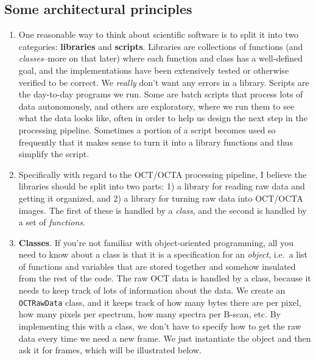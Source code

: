\documentclass[11pt]{article}
\begin{document}
    \hypertarget{some-architectural-principles}{%
\subsection{Some architectural
principles}\label{some-architectural-principles}}

\begin{enumerate}
\def\labelenumi{\arabic{enumi}.}
\item
  One reasonable way to think about scientific software is to split it
  into two categories: \textbf{libraries} and \textbf{scripts}.
  Libraries are collections of functions (and \emph{classes}--more on
  that later) where each function and class has a well-defined goal, and
  the implementations have been extensively tested or otherwise verified
  to be correct. We \emph{really} don't want any errors in a library.
  Scripts are the day-to-day programs we run. Some are batch scripts
  that process lots of data autonomously, and others are exploratory,
  where we run them to see what the data looks like, often in order to
  help us design the next step in the processing pipeline. Sometimes a
  portion of a script becomes used so frequently that it makes sense to
  turn it into a library functions and thus simplify the script.
\item
  Specifically with regard to the OCT/OCTA processing pipeline, I
  believe the libraries should be split into two parts: 1) a library for
  reading raw data and getting it organized, and 2) a library for
  turning raw data into OCT/OCTA images. The first of these is handled
  by a \emph{class}, and the second is handled by a set of
  \emph{functions}.
\item
  \textbf{Classes}. If you're not familiar with object-oriented
  programming, all you need to know about a class is that it is a
  specification for an \emph{object}, i.e.~a list of functions and
  variables that are stored together and somehow insulated from the rest
  of the code. The raw OCT data is handled by a class, because it needs
  to keep track of lots of information about the data. We create an
  \texttt{OCTRawData} class, and it keeps track of how many bytes there
  are per pixel, how many pixels per spectrum, how many spectra per
  B-scan, etc. By implementing this with a class, we don't have to
  specify how to get the raw data every time we need a new frame. We
  just instantiate the object and then ask it for frames, which will be
  illustrated below.
\end{enumerate}
\end{document}
